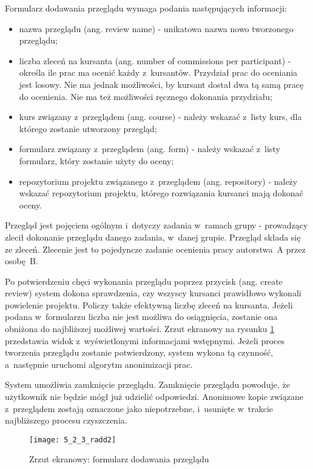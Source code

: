 \medskip
Formularz dodawania przeglądu wymaga podania następujących informacji:
\begin{itemize}
    \item nazwa przeglądu (ang. review name) - unikatowa nazwa nowo tworzonego przeglądu;
    \item liczba zleceń na kursanta (ang. number of commissions per participant) - określa ile prac ma ocenić każdy z~kursantów. Przydział prac do oceniania jest losowy. Nie ma jednak możliwości, by kursant dostał dwa tą samą pracę do ocenienia. Nie ma też możliwości ręcznego dokonania przydziału; 
    \item kurs związany z~przeglądem (ang. course) - należy wskazać z~listy kurs, dla którego zostanie utworzony przegląd;
    \item formularz związany z~przeglądem (ang. form) - należy wskazać z~listy formularz, który zostanie użyty do oceny;
    \item repozytorium projektu związanego z~przeglądem (ang. repository) - należy wskazać repozytorium projektu, którego rozwiązania kursanci mają dokonać oceny. 
\end{itemize}

\medskip
Przegląd jest pojęciem ogólnym i~dotyczy zadania w~ramach grupy - prowadzący zlecił dokonanie przeglądu danego zadania, w~danej grupie. Przegląd składa się ze zleceń. Zlecenie jest to pojedyncze zadanie ocenienia pracy autorstwa~A przez osobę~B.

\medskip
Po potwierdzeniu chęci wykonania przeglądu poprzez przycisk  (ang. create review) system dokona sprawdzenia, czy wszyscy kursanci prawidłowo wykonali powielenie projektu. Policzy także efektywną liczbę zleceń na kursanta. Jeżeli podana w~formularzu liczba nie jest możliwa do osiągnięcia, zostanie ona obniżona do najbliższej możliwej wartości. Zrzut ekranowy na rysunku \ref{obr523} przedstawia widok z~wyświetlonymi informacjami wstępnymi. Jeżeli proces tworzenia przeglądu zostanie potwierdzony, system wykona tą czynność, a~następnie uruchomi algorytm anonimizacji prac.

\medskip
System umożliwia zamknięcie przeglądu. Zamknięcie przeglądu powoduje, że użytkownik nie będzie mógł już udzielić odpowiedzi. Anonimowe kopie związane z~przeglądem zostają oznaczone jako niepotrzebne, i~usunięte w~trakcie najbliższego procesu czyszczenia. 

\begin{figure}[!h]
    \texttt{[image: 5\_2\_3\_radd2]}
    \caption{Zrzut ekranowy: formularz dodawania przeglądu}
    \label{obr523}
\end{figure}

